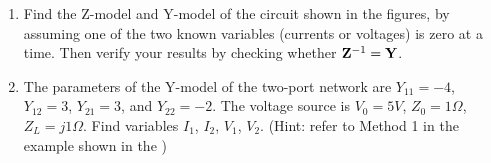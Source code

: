 \begin{enumerate}
\item Find the Z-model and Y-model of the circuit shown in the figures, by
assuming one of the two known variables (currents or voltages) is zero at
a time. Then verify your results by checking whether ${\bf Z}^{-1}={\bf Y}$.





\item The parameters of the Y-model of the two-port network are $Y_{11}=-4$, 
$Y_{12}=3$, $Y_{21}=3$, and $Y_{22}=-2$. The voltage source is $V_0=5V$, 
$Z_0=1\Omega$, $Z_L=j1\Omega$. Find variables $I_1$, $I_2$, $V_1$, $V_2$. 
(Hint: refer to Method 1 in the example shown in the
)




\end{enumerate}

